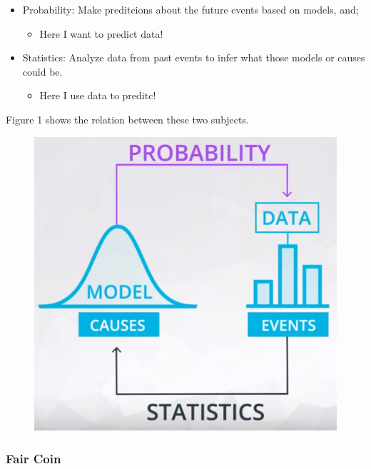 \documentclass[]{book}
\providecommand{\tightlist}{%
  \setlength{\itemsep}{0pt}\setlength{\parskip}{0pt}}
\begin{document}
\begin{itemize}
\tightlist
\item
  Probability: Make preditcions about the future events based on models,
  and;

  \begin{itemize}
  \tightlist
  \item
    Here I want to predict data!
  \end{itemize}
\item
  Statistics: Analyze data from past events to infer what those models
  or causes could be.

  \begin{itemize}
  \tightlist
  \item
    Here I use data to preditc!
  \end{itemize}
\end{itemize}

Figure 1 shows the relation between these two subjects.

\begin{figure}
\centering
\includegraphics{01-img/c4_l4_01.png}
\caption{}
\end{figure}

\subsubsection{Fair Coin}\label{fair-coin}
\end{document}

